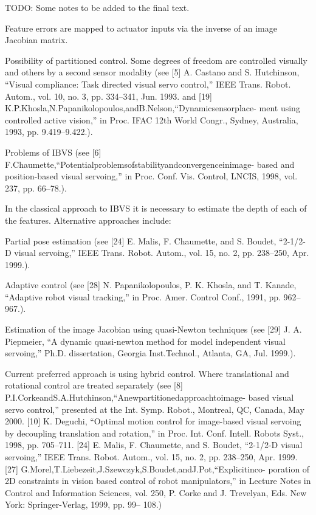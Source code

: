 TODO: Some notes to be added to the final text. 

\cite{guenard_2008}

Feature errors are mapped to actuator inputs via the inverse of an image Jacobian matrix.

Possibility of partitioned control. Some degrees of freedom are controlled visually and others by a second sensor modality (see [5] A. Castano and S. Hutchinson, “Visual compliance: Task directed visual servo control,” IEEE Trans. Robot. Autom., vol. 10, no. 3, pp. 334–341, Jun. 1993. and [19] K.P.Khosla,N.Papanikolopoulos,andB.Nelson,“Dynamicsensorplace-
ment using controlled active vision,” in Proc. IFAC 12th World Congr., Sydney, Australia, 1993, pp. 9.419–9.422.).

Problems of IBVS (see [6] F.Chaumette,“Potentialproblemsofstabilityandconvergenceinimage- based and position-based visual servoing,” in Proc. Conf. Vis. Control, LNCIS, 1998, vol. 237, pp. 66–78.).

In the classical approach to IBVS it is necessary to estimate the depth of each of the features. Alternative approaches include:

Partial pose estimation (see [24] E. Malis, F. Chaumette, and S. Boudet, “2-1/2-D visual servoing,” IEEE Trans. Robot. Autom., vol. 15, no. 2, pp. 238–250, Apr. 1999.).

Adaptive control (see [28] N. Papanikolopoulos, P. K. Khosla, and T. Kanade, “Adaptive robot visual tracking,” in Proc. Amer. Control Conf., 1991, pp. 962–967.). 

Estimation of the image Jacobian using quasi-Newton techniques (see [29] J. A. Piepmeier, “A dynamic quasi-newton method for model independent visual servoing,” Ph.D. dissertation, Georgia Inst.Technol., Atlanta, GA, Jul. 1999.).

Current preferred approach is using hybrid control. Where translational and rotational control are treated separately (see [8] P.I.CorkeandS.A.Hutchinson,“Anewpartitionedapproachtoimage- based visual servo control,” presented at the Int. Symp. Robot., Montreal, QC, Canada, May 2000. 
[10] K. Deguchi, “Optimal motion control for image-based visual servoing by decoupling translation and rotation,” in Proc. Int. Conf. Intell. Robots Syst., 1998, pp. 705–711. [24] E. Malis, F. Chaumette, and S. Boudet, “2-1/2-D visual servoing,” IEEE Trans. Robot. Autom., vol. 15, no. 2, pp. 238–250, Apr. 1999. [27] G.Morel,T.Liebezeit,J.Szewczyk,S.Boudet,andJ.Pot,“Explicitinco- poration of 2D constraints in vision based control of robot manipulators,” in Lecture Notes in Control and Information Sciences, vol. 250, P. Corke and J. Trevelyan, Eds. New York: Springer-Verlag, 1999, pp. 99– 108.) 

